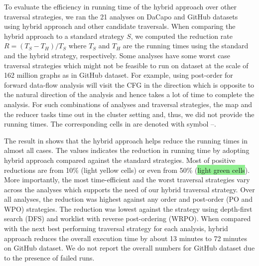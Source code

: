

To evaluate the efficiency in running time of the hybrid approach over other 
traversal strategies, we ran the 21 analyses on DaCapo and GitHub 
datasets using hybrid approach and other candidate traversals. When comparing 
the hybrid approach to a standard strategy $S$, we computed the reduction 
rate $R=(T_S-T_H)/T_S$ where $T_S$ and $T_H$ are the running times using the 
standard and the hybrid strategy, respectively. 
%
Some analyses have some worst case traversal strategies which might not be 
feasible to run on dataset at the scale of 162 million graphs as in 
GitHub dataset. For example, using post-order for forward data-flow 
analysis will visit the CFG in the direction which is opposite to the 
natural direction of the analysis and hence takes a lot of time to complete 
the analysis. For such combinations of analyses and traversal strategies, the 
map and the reducer tasks time out in the cluster setting and, thus, we did 
not provide the running times. 
The corresponding cells in  are denoted with symbol --.
%

The result in  shows that the hybrid approach 
helps reduce the running times in almost all cases. The values indicates the 
reduction in running time by adopting hybrid approach compared against the standard strategies. 
Most of positive reductions are from 10\% (\colorbox{lightblack}{light yellow 
cells}) or even from 50\% (\colorbox{lightgreen}{light green cells}). More 
importantly, the most time-efficient and the worst traversal strategies vary 
across the analyses which supports the need of our hybrid traversal strategy.
%
Over all analyses, the reduction was highest against any order and 
post-order (PO and WPO) strategies. The reduction was lowest against the strategy 
using depth-first search (DFS) and worklist with reverse post-ordering (WRPO). 
When compared with the next best performing traversal strategy for each analysis, hybrid approach reduces the overall execution time by 
about 13 minutes to 72 minutes on GitHub dataset. We do not 
report the overall numbers for GitHub dataset due to the presence of failed 
runs.

